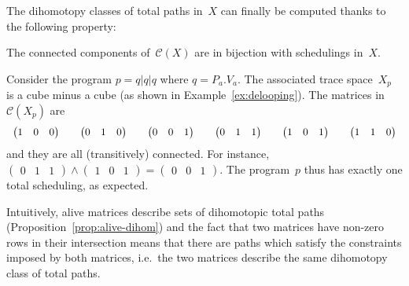 \documentclass[orivec]{llncs} \usepackage[T1]{fontenc}
\newcommand{\C}{\mathcal{C}}
\newcommand{\ie}{i.e.~}
\renewcommand{\P}[1]{P_{#1}}
\newcommand{\V}[1]{V_{#1}}
\newcommand{\pa}[1]{\left(#1\right)}
\renewcommand{\C}{\mathcal{C}}
\begin{document}
\noindent
The dihomotopy classes of total paths in~$X$ can finally be computed thanks to
the following property:

\begin{proposition}
  \label{prop:conn-comp}
  The connected components of~$\C(X)$ are in bijection with schedulings in~$X$.
\end{proposition}

\begin{example}
  \label{ex:cube}
  Consider the program $p=q|q|q$ where $q=\P a.\V a$. The associated trace
  space~$X_p$ is a cube minus a cube (as shown in Example~\ref{ex:delooping}).
  The matrices in~$\C(X_p)$ are
\[
  \begin{array}{c@{\qquad}c@{\qquad}c@{\qquad}c@{\qquad}c@{\qquad}c}
    \pa{
      \begin{matrix}
        1&0&0
      \end{matrix}
    }
    &
    \pa{
      \begin{matrix}
        0&1&0
      \end{matrix}
    }
    &
    \pa{
      \begin{matrix}
        0&0&1
      \end{matrix}
    }
    &
    \pa{
      \begin{matrix}
        0&1&1
      \end{matrix}
    }
    &
    \pa{
      \begin{matrix}
        1&0&1
      \end{matrix}
    }
    &
    \pa{
      \begin{matrix}
        1&1&0
      \end{matrix}
    }
  \end{array}
  \]
  and they are all (transitively) connected. For instance,
  $
  \pa{
    \begin{matrix}
      0&1&1
    \end{matrix}
  }
  \wedge
  \pa{
    \begin{matrix}
      1&0&1
    \end{matrix}
  }
  =
  \pa{
    \begin{matrix}
      0&0&1
    \end{matrix}
  } $. The program~$p$ thus has exactly one total scheduling, as expected.
\end{example}

Intuitively, alive matrices describe sets of dihomotopic total paths
(Proposition~\ref{prop:alive-dihom}) and the fact that two matrices have
non-zero rows in their intersection means that there are paths which satisfy
the constraints imposed by both matrices, \ie the two matrices describe the same
dihomotopy class of total paths.
\end{document}
